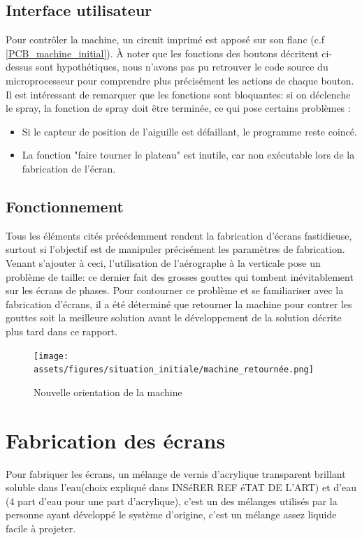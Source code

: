\newpage
\subsection{Interface utilisateur}
Pour contrôler la machine, un circuit imprimé est apposé sur son flanc (c.f \autoref{PCB_machine_initial}).
À noter que les fonctions des boutons décritent ci-dessus sont hypothétiques, nous n'avons pas pu retrouver le code
source du microprocesseur pour comprendre plus précisément les actions de chaque bouton. Il est intéressant de remarquer
que les fonctions sont bloquantes: si on déclenche le spray, la fonction de spray doit être terminée, ce qui pose certains problèmes :

\begin{itemize}
  \item Si le capteur de position de l'aiguille est défaillant, le programme reste coincé.
  \item La fonction "faire tourner le plateau" est inutile, car non exécutable lors de la fabrication de l'écran.
\end{itemize}

\subsection{Fonctionnement}

Tous les éléments cités précédemment rendent la fabrication d'écrans fastidieuse, surtout si l'objectif est de manipuler précisément les paramètres de fabrication.
Venant s'ajouter à ceci, l'utilisation de l'aérographe à la verticale pose un problème de taille: ce dernier fait des grosses gouttes qui tombent inévitablement sur
les écrans de phases. Pour contourner ce problème et se familiariser avec la fabrication d'écrans, il a été déterminé que retourner la machine pour contrer les gouttes
soit la meilleure solution avant le développement de la solution décrite plus tard dans ce rapport.

\begin{figure}[H]
  \centering
  \texttt{[image: assets/figures/situation\_initiale/machine\_retournée.png]}
  \caption{Nouvelle orientation de la machine}
\end{figure}

\newpage
\section{Fabrication des écrans}
Pour fabriquer les écrans, un mélange de vernis d'acrylique transparent brillant soluble dans l'eau(choix expliqué dans \color{red}INSéRER REF éTAT DE L'ART\color{black}) et d'eau (4 part d'eau pour une part d'acrylique),
c'est un des mélanges utilisés par la personne ayant développé le système d'origine, c'est un mélange assez liquide facile à projeter.

